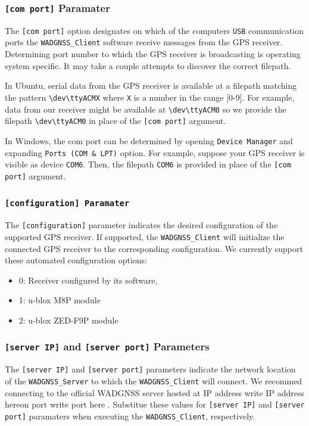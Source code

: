 \subsubsection{\texttt{[com port]} Paramater}
The \texttt{[com port]} option designates on which of the computers \texttt{USB} communication ports the \texttt{WADGNSS\_Client} software receive messages from the GPS receiver. 
Determining port number to which the GPS receiver is broadcasting is operating system specific.
It may take a couple attempts to discover the correct filepath. 

In Ubuntu, serial data from the GPS receiver is available at a filepath matching the pattern \texttt{\textbackslash dev\textbackslash ttyACMX} where \texttt{X} is a number in the range [0-9]. For example, data from our receiver might be available at \texttt{\textbackslash dev\textbackslash ttyACM0} so we provide the filepath \texttt{\textbackslash dev\textbackslash ttyACM0} in place of the \texttt{[com port]} argument.

In Windows, the com port can be determined by opening \texttt{Device Manager} and expanding \texttt{Ports (COM \& LPT)} option. For example, suppose your GPS receiver is visible as device \texttt{COM6}. Then, the filepath \texttt{COM6} is provided in place of the \texttt{[com port]} argument.

\subsubsection{\texttt{[configuration] Paramater}}
The \texttt{[configuration]} parameter indicates the desired configuration of the supported GPS receiver. If supported, the \texttt{WADGNSS\_Client} will initialize the connected GPS receiver to the corresponding configuration. We currently support these automated configuration options:
\begin{itemize}
\item 0: Receiver configured by its software,
\item 1: u-blox M8P module
\item 2: u-blox ZED-F9P module
\end{itemize}

\subsubsection{\texttt{[server IP]} and \texttt{[server port]} Parameters}
The \texttt{[server IP]} and \texttt{[server port]} parameters indicate the network location of the  \texttt{WADGNSS\_Server} to which the \texttt{WADGNSS\_Client} will connect. 
We recommed connecting to the official WADGNSS server hosted at IP address \green write IP address here\black on port \green write port here \black . Substitue these values for \texttt{[server IP]} and \texttt{[server port]} paramaters when executing the \texttt{WADGNSS\_Client}, respectively.

